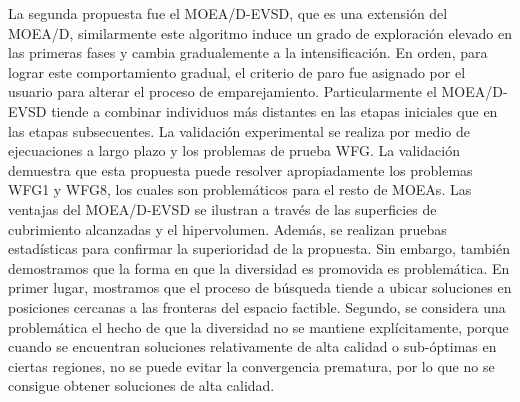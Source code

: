 La segunda propuesta fue el MOEA/D-EVSD, que es una extensión del MOEA/D, similarmente este algoritmo induce un grado de exploración elevado en las primeras fases y cambia gradualemente a la intensificación.
%
En orden, para lograr este comportamiento gradual, el criterio de paro fue asignado por el usuario para alterar el proceso de emparejamiento.
%
Particularmente el MOEA/D-EVSD tiende a combinar individuos más distantes en las etapas iniciales que en las etapas subsecuentes.
%
La validación experimental se realiza por medio de ejecuaciones a largo plazo y los problemas de prueba WFG.
%
La validación demuestra que esta propuesta puede resolver apropiadamente los problemas WFG1 y WFG8, los cuales son problemáticos para el resto de MOEAs.
%
Las ventajas del MOEA/D-EVSD se ilustran a través de las superficies de cubrimiento alcanzadas y el hipervolumen.
%
Además, se realizan pruebas estadísticas para confirmar la superioridad de la propuesta.
%
Sin embargo, también demostramos que la forma en que la diversidad es promovida es problemática.
%
En primer lugar, mostramos que el proceso de búsqueda tiende a ubicar soluciones en posiciones cercanas a las fronteras del espacio factible.
%
Segundo, se considera una problemática el hecho de que la diversidad no se mantiene explícitamente, porque cuando se encuentran soluciones relativamente de alta calidad o sub-óptimas en ciertas regiones, no se puede evitar la convergencia prematura, por lo que no se consigue obtener soluciones de alta calidad.



